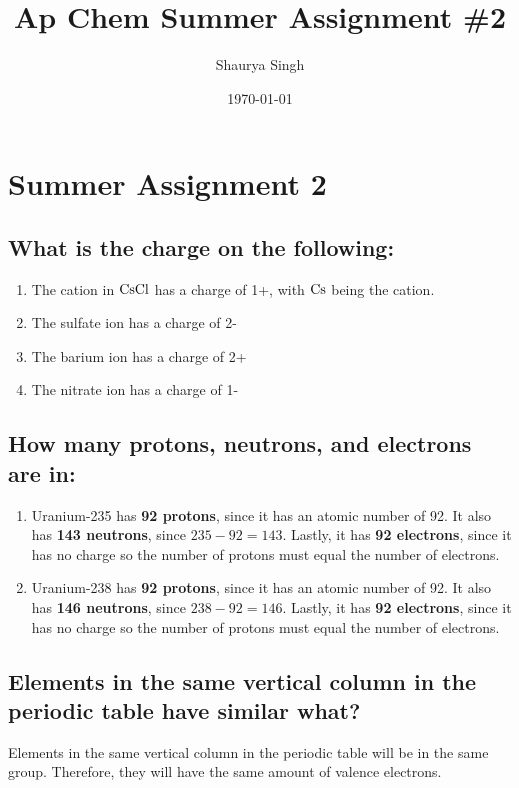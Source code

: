 \documentclass[11pt]{article}
\author{Shaurya Singh}
\date{\today}
\title{Ap Chem Summer Assignment \#2}
\begin{document}
\maketitle
\setcounter{tocdepth}{1}
\tableofcontents



\section{Summer Assignment 2}
\label{sec:orgcd7436f}
\subsection{What is the charge on the following:}
\label{sec:org94afa8d}
\begin{enumerate}
\item The cation in \(\ce{CsCl}\) has a charge of 1+, with \(\ce{Cs}\) being the cation.
\item The sulfate ion has a charge of 2-
\item The barium ion has a charge of 2+
\item The nitrate ion has a charge of 1-
\end{enumerate}

\subsection{How many protons, neutrons, and electrons are in:}
\label{sec:orgdb7bf1f}
\begin{enumerate}
\item Uranium-235 has \textbf{92 protons}, since it has an atomic number of 92. It also has \textbf{143 neutrons}, since \(235-92=143\). Lastly, it has \textbf{92 electrons}, since it has no charge so the number of protons must equal the number of electrons.
\item Uranium-238 has \textbf{92 protons}, since it has an atomic number of 92. It also has \textbf{146 neutrons}, since \(238-92=146\). Lastly, it has \textbf{92 electrons}, since it has no charge so the number of protons must equal the number of electrons.
\end{enumerate}

\subsection{Elements in the same vertical column in the periodic table have similar what?}
\label{sec:orgd6e3c57}
Elements in the same vertical column in the periodic table will be in the same group. Therefore, they will have the same amount of valence electrons.
\end{document}
